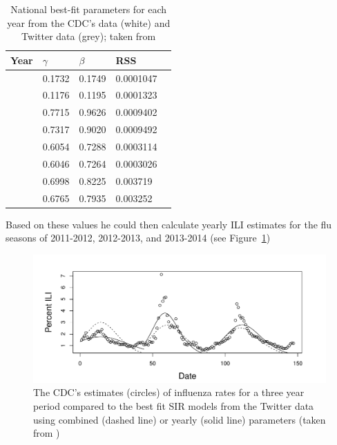 \documentclass[11pt, a4paper]{report}\usepackage[]{graphicx}\usepackage[]{color}
\begin{document}
\begin{table}[H]
\centering
\begin{tabular}{l l l l l}

 Year & \(\gamma\) & \(\beta\) & RSS\\ \hline
& 0.1732 & 0.1749  & 0.0001047   \\ 
 {\multirow{-2}{*}{ 2011-2012 }}  & \cellcolor{grey}0.1176  & \cellcolor{grey}0.1195  & \cellcolor{grey}0.0001323  \\ \cline{2-4}
  {\multirow{2}{*}{ 2012-2013 }}& 0.7715 & 0.9626 & 0.0009402   \\ 
   & \cellcolor{grey}0.7317  & \cellcolor{grey}0.9020 & \cellcolor{grey}0.0009492   \\ \cline{2-4}
  {\multirow{2}{*}{ 2013-2014 }}& 0.6054 & 0.7288   & 0.0003114   \\ 
   & \cellcolor{grey}0.6046 & \cellcolor{grey}0.7264 & \cellcolor{grey}0.0003026  \\ \cline{2-4}
  {\multirow{2}{*}{ Combined }}& 0.6998 & 0.8225  & 0.003719   \\ 
   & \cellcolor{grey}0.6765  & \cellcolor{grey}0.7935  & \cellcolor{grey}0.003252   \\ 
\end{tabular}
\caption{National best-fit parameters for each year from the CDC's data (white) and Twitter data (grey); taken from \citep{bodnar_ground_2014}}
\label{tab:nationalparams}
\end{table}

Based on these values he could then calculate yearly ILI estimates for the flu seasons of 2011-2012, 2012-2013, and 2013-2014 (see Figure~\ref{fig:cdc_fit_bodnar_thesis_SIR})\newline

\begin{figure}[H]
  \centering
    \includegraphics[width=.9\textwidth]{todd_bodnar_SIR.png}
  \caption{The CDC's estimates (circles) of influenza rates for a three year period compared to the best fit SIR models from the Twitter data using combined (dashed line) or yearly (solid line) parameters (taken from \citep{bodnar_data_2015})}
  \label{fig:cdc_fit_bodnar_thesis_SIR}
  \end{figure}
\end{document}
